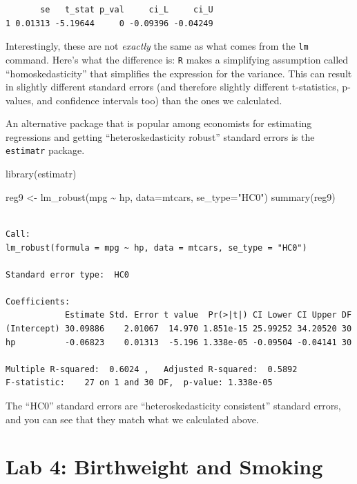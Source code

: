 \documentclass[
  letterpaper,
  DIV=11,
  numbers=noendperiod]{scrreprt}
\newenvironment{Shaded}{\begin{snugshade}}{\end{snugshade}}
\newcommand{\AttributeTok}[1]{\textcolor[rgb]{0.40,0.45,0.13}{#1}}
\newcommand{\FunctionTok}[1]{\textcolor[rgb]{0.28,0.35,0.67}{#1}}
\newcommand{\NormalTok}[1]{\textcolor[rgb]{0.00,0.23,0.31}{#1}}
\newcommand{\OtherTok}[1]{\textcolor[rgb]{0.00,0.23,0.31}{#1}}
\newcommand{\SpecialCharTok}[1]{\textcolor[rgb]{0.37,0.37,0.37}{#1}}
\newcommand{\StringTok}[1]{\textcolor[rgb]{0.13,0.47,0.30}{#1}}
\begin{document}
\begin{verbatim}
       se   t_stat p_val     ci_L     ci_U
1 0.01313 -5.19644     0 -0.09396 -0.04249
\end{verbatim}

Interestingly, these are not \emph{exactly} the same as what comes from
the \texttt{lm} command. Here's what the difference is: \texttt{R} makes
a simplifying assumption called ``homoskedasticity'' that simplifies the
expression for the variance. This can result in slightly different
standard errors (and therefore slightly different t-statistics,
p-values, and confidence intervals too) than the ones we calculated.

An alternative package that is popular among economists for estimating
regressions and getting ``heteroskedasticity robust'' standard errors is
the \texttt{estimatr} package.

\begin{Shaded}
\begin{Highlighting}[]
\FunctionTok{library}\NormalTok{(estimatr)}

\NormalTok{reg9 }\OtherTok{\textless{}{-}} \FunctionTok{lm\_robust}\NormalTok{(mpg }\SpecialCharTok{\textasciitilde{}}\NormalTok{ hp, }\AttributeTok{data=}\NormalTok{mtcars, }\AttributeTok{se\_type=}\StringTok{"HC0"}\NormalTok{)}
\FunctionTok{summary}\NormalTok{(reg9)}
\end{Highlighting}
\end{Shaded}

\begin{verbatim}

Call:
lm_robust(formula = mpg ~ hp, data = mtcars, se_type = "HC0")

Standard error type:  HC0 

Coefficients:
            Estimate Std. Error t value  Pr(>|t|) CI Lower CI Upper DF
(Intercept) 30.09886    2.01067  14.970 1.851e-15 25.99252 34.20520 30
hp          -0.06823    0.01313  -5.196 1.338e-05 -0.09504 -0.04141 30

Multiple R-squared:  0.6024 ,   Adjusted R-squared:  0.5892 
F-statistic:    27 on 1 and 30 DF,  p-value: 1.338e-05
\end{verbatim}

The ``HC0'' standard errors are ``heteroskedasticity consistent''
standard errors, and you can see that they match what we calculated
above.

\section{Lab 4: Birthweight and
Smoking}\label{lab-4-birthweight-and-smoking}
\end{document}
